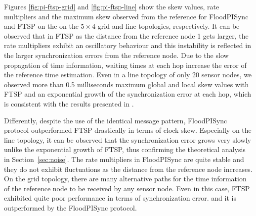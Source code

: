 \documentclass[english,a4paper,10pt,final]{article}
\numberwithin{equation}{section}
\numberwithin{figure}{section}
\begin{document}
\begin{figure*}
\center



\caption{\label{fig:pi-ftsp-line} Global skew, local skew, rate multipliers and maximum skew to the reference node on {\bf line topology} for \textbf{FloodPISync} (left column) and \textbf{FTSP} (right column), respectively.}
\end{figure*}


Figures \ref{fig:pi-ftsp-grid} and \ref{fig:pi-ftsp-line} show the skew values, rate multipliers and the maximum skew observed from the reference for FloodPISync and FTSP on the on the $5\times 4$ grid  and line topologies, respectively. It can be observed that in FTSP as the distance from the reference node 1 gets larger, the rate multipliers exhibit an oscillatory behaviour and this instability is reflected in the larger synchronization errors from the reference node. Due to the slow propagation of time information, waiting times at each hop increase the error of the reference time estimation. Even in a line topology of only 20 sensor nodes, we observed more than 0.5 milliseconds maximum global and local skew values with FTSP and an exponential growth of the synchronization error at each hop, which is consistent with the results presented in \cite{Lenzen2009Optimal}.

Differently, despite the use of the identical message pattern, FloodPISync protocol outperformed FTSP drastically in terms of clock skew. Especially on the line topology, it can be observed that the synchronization error grows very slowly unlike the exponential growth of FTSP, thus confirming the theoretical analysis in Section~\ref{sec:noise}. The rate multipliers in FloodPISync are quite stable and they do not exhibit fluctuations as the distance from the reference node increases. On the grid topology, there are many alternative paths for the time information of the reference node to be received by any sensor node. Even in this case, FTSP exhibited quite poor performance in terms of synchronization error. and it is outperformed by the FloodPISync protocol.
\end{document}
